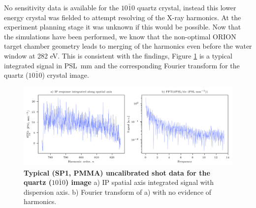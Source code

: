 No sensitivity data is available for the $10\bar{1}0$ quartz crystal, instead this lower energy crystal was fielded to attempt resolving of the X-ray harmonics. At the experiment planning stage it was unknown if this would be possible. Now that the simulations have been performed, we know that the non-optimal ORION target chamber geometry leads to merging of the harmonics even before the water window at 282 eV. This is consistent with the findings, Figure \ref{fig:orionq1010} is a typical integrated signal in \unit{PSL.mm} and the corresponding Fourier transform for the quartz ($10\bar{1}0$) crystal image.
\begin{figure}
	\centering
	\includegraphics[width=1\linewidth]{figures/orion/orion_q1010}
	\caption[Typical ORION experiment uncalibrated IP response quartz ($10\bar{1}0$) crystal and Fourier transform]{\textbf{Typical (SP1, PMMA) uncalibrated shot data for the quartz ($10\bar{1}0$) image} a) IP spatial axis integrated signal with dispersion axis. b) Fourier transform of a) with no evidence of harmonics.}
	\label{fig:orionq1010}
\end{figure}

